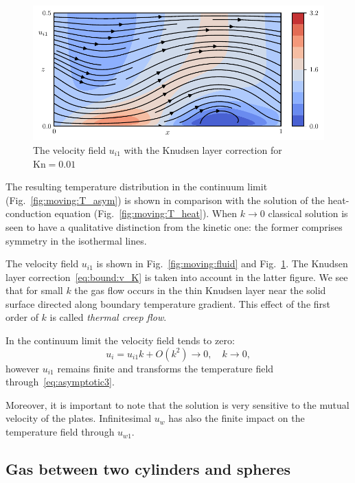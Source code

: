 \documentclass[smallextended, referee]{svjour3} %
\newcommand{\Kn}{\mathrm{Kn}}
\begin{document}
\begin{figure}
	\centering
	\includegraphics{Fig6}
	\caption{The velocity field \(u_{i1}\) with the Knudsen layer correction for \(\Kn=0.01\)}\label{fig:moving:kn001}
\end{figure}

The resulting temperature distribution in the continuum limit (Fig.~\ref{fig:moving:T_asym}) is shown
in comparison with the solution of the heat-conduction equation (Fig.~\ref{fig:moving:T_heat}).
When \(k\to0\) classical solution is seen to have a qualitative distinction from the kinetic one: 
the former comprises symmetry in the isothermal lines.

The velocity field \(u_{i1}\) is shown in Fig.~\ref{fig:moving:fluid} and Fig.~\ref{fig:moving:kn001}.
The Knudsen layer correction~\eqref{eq:bound:v_K} is taken into account in the latter figure.
We see that for small \(k\) the gas flow occurs in the thin Knudsen layer near the solid surface
directed along boundary temperature gradient.
This effect of the first order of \(k\) is called \textit{thermal creep flow}.

In the continuum limit the velocity field tends to zero:
\[ u_i = u_{i1}k + O(k^2) \to 0, \quad k\to0, \]
however \(u_{i1}\) remains finite and transforms the temperature field through~\eqref{eq:asymptotic3}.

Moreover, it is important to note that the solution is very sensitive to the mutual velocity of the plates.
Infinitesimal \(u_w\) has also the finite impact on the temperature field through \(u_{w1}\).

\subsection{Gas between two cylinders and spheres}
\end{document}
